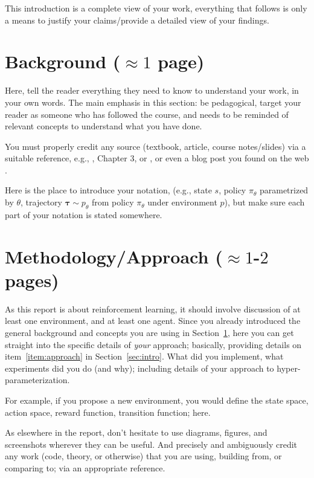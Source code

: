 \documentclass[journal, a4paper]{IEEEtran}
\begin{document}
This introduction is a complete view of your work, everything that follows is only a means to justify your claims/provide a detailed view of your findings. 
		

\section{Background ($\approx 1$ page)}
\label{sec:background}

Here, tell the reader everything they need to know to understand your work, in your own words. The main emphasis in this section: be pedagogical, target your reader as someone who has followed the course,  and needs to be reminded of relevant concepts to understand what you have done. 

You must properly credit any source (textbook, article, course notes/slides) via a suitable reference,  e.g., \cite{RLBook}, Chapter 3, or \cite{Lecture4}, or even a blog post you found on the web \cite{Post3}. 

Here is the place to introduce your notation, (e.g., state $s$, policy $\pi_\theta$ parametrized by $\theta$, trajectory $\boldsymbol\tau \sim p_\theta$ from policy $\pi_\theta$ under environment $p$), but make sure each part of your notation is stated somewhere. 

\section{Methodology/Approach ($\approx 1$-$2$ pages)}

As this report is about reinforcement learning, it should involve discussion of at least one environment, and at least one agent. Since you already introduced the general background and concepts you are using in Section~\ref{sec:background}, here you can get straight into the specific details of \emph{your} approach; basically, providing details on item~\ref{item:approach} in Section~\ref{sec:intro}. What did you implement, what experiments did you do (and why); including details of your approach to hyper-parameterization. 

For example, if you propose a new environment, you would define the state space, action space, reward function, transition function; here.

As elsewhere in the report, don't hesitate to use diagrams, figures, and screenshots wherever they can be useful. And precisely and ambiguously credit any work (code, theory, or otherwise) that you are using, building from, or comparing to; via an appropriate reference.  
\end{document}
